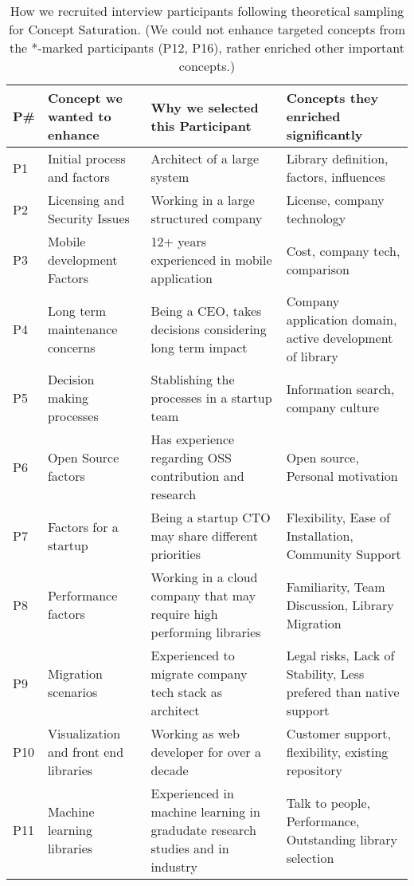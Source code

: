 \begin{table*}[]
    \centering
    \caption{How we recruited interview participants following theoretical sampling for Concept Saturation. (We could not enhance targeted concepts from the *-marked participants (P12, P16), rather enriched other important concepts.)}
    \begin{tabular}{>{\raggedright}p{.4cm}p{3.8cm}p{5.5cm}p{5cm}}%
    \toprule
    P\# & Concept we wanted to enhance & Why we selected this Participant & Concepts they enriched significantly \\ 
    \midrule
P1 & Initial process and factors & Architect of a large system & Library definition, factors, influences \\ 
P2 & Licensing and Security Issues & Working in a large structured company & License, company technology \\ 
P3 & Mobile development Factors & 12+ years experienced in mobile application & Cost, company tech, comparison  \\ 
P4 & Long term maintenance concerns & Being a CEO, takes decisions considering long term impact & Company application domain, active development of library \\ 
P5 & Decision making processes & Stablishing the processes in a startup team & Information search, company culture \\ 
P6 & Open Source factors & Has experience regarding OSS contribution and research & Open source, Personal motivation \\ 
P7 & Factors for a startup & Being a startup CTO may share different priorities & Flexibility, Ease of Installation, Community Support \\ 
P8 & Performance factors & Working in a cloud company that may require high performing libraries & Familiarity, Team Discussion, Library Migration \\ 
P9 & Migration scenarios & Experienced to migrate company tech stack as architect & Legal risks, Lack of Stability, Less prefered than native support \\ 
P10 & Visualization and front end libraries & Working as web developer for over a decade & Customer support, flexibility, existing repository \\ 
P11 & Machine learning libraries & Experienced in machine learning in gradudate research studies and in industry & Talk to people, Performance, Outstanding library selection \\ 

\end{tabular}
\end{table*}
